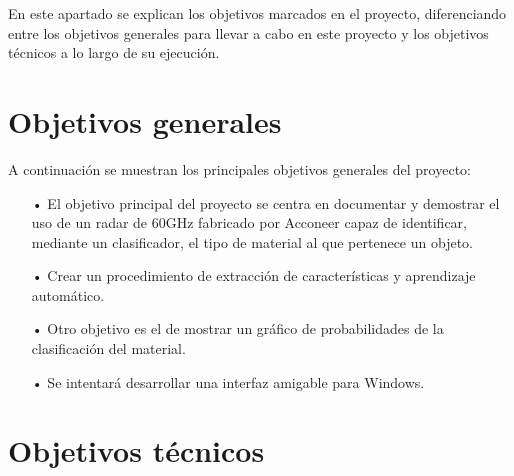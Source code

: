 
En este apartado se explican los objetivos marcados en el proyecto, diferenciando entre los objetivos generales para llevar a cabo en este proyecto y los objetivos técnicos a lo largo de su ejecución.

\section{Objetivos generales}

A continuación se muestran los principales objetivos generales del proyecto:
\begin{itemize}
\item[•] El objetivo principal del proyecto se centra en documentar y demostrar el uso de un radar de 60GHz fabricado por Acconeer capaz de identificar, mediante un clasificador, el tipo de material al que pertenece un objeto.
\item[•] Crear un procedimiento de extracción de características y aprendizaje automático.

\item[•]Otro objetivo es el de mostrar un gráfico de probabilidades de la clasificación del material.

\item[•]Se intentará desarrollar una interfaz amigable para Windows.
\end{itemize}

\section{Objetivos técnicos}